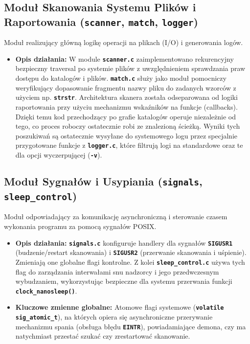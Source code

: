 \documentclass{article}
\begin{document}
	\subsection{Moduł Skanowania Systemu Plików i Raportowania (\textbf{\texttt{scanner}}, \textbf{\texttt{match}}, \textbf{\texttt{logger}})}
	Moduł realizujący główną logikę operacji na plikach (I/O) i generowania logów.
	\begin{itemize}
		\item \textbf{Opis działania:} W module \textbf{\texttt{scanner.c}} zaimplementowano rekurencyjny bezpieczny traversal po systemie plików z uwzględnieniem sprawdzania praw dostępu do katalogów i plików. \textbf{\texttt{match.c}} służy jako moduł pomocniczy weryfikujący dopasowanie fragmentu nazwy pliku do zadanych wzorców z użyciem np. \textbf{\texttt{strstr}}. Architektura skanera została odseparowana od logiki raportowania przy użyciu mechanizmu wskaźników na funkcje (callbacks). Dzięki temu kod przechodzący po grafie katalogów operuje niezależnie od tego, co proces roboczy ostatecznie robi ze znalezioną ścieżką. Wyniki tych poszukiwań są ostatecznie wysyłane do systemowego logu przez specjalnie przygotowane funkcje z \textbf{\texttt{logger.c}}, które filtrują logi na standardowe oraz te dla opcji wyczerpującej (\textbf{\texttt{-v}}).
	\end{itemize}
	
	\subsection{Moduł Sygnałów i Usypiania (\textbf{\texttt{signals}}, \textbf{\texttt{sleep\_control}})}
	Moduł odpowiadający za komunikację asynchroniczną i sterowanie czasem wykonania programu za pomocą sygnałów POSIX.
	\begin{itemize}
		\item \textbf{Opis działania:} \textbf{\texttt{signals.c}} konfiguruje handlery dla sygnałów \textbf{\texttt{SIGUSR1}} (budzenie/restart skanowania) i \textbf{\texttt{SIGUSR2}} (przerwanie skanowania i uśpienie). Zmieniają one globalne flagi kontrolne. Z kolei \textbf{\texttt{sleep\_control.c}} używa tych flag do zarządzania interwałami snu nadzorcy i jego przedwczesnym wybudzaniem, wykorzystując bezpieczne dla systemu przerwania funkcji \textbf{\texttt{clock\_nanosleep()}}.
		\item \textbf{Kluczowe zmienne globalne:} Atomowe flagi systemowe (\textbf{\texttt{volatile sig\_atomic\_t}}), na których opiera się asynchroniczne przerywanie mechanizmu spania (obsługa błędu \textbf{\texttt{EINTR}}), powiadamiające demona, czy ma natychmiast przestać szukać czy zrestartować skanowanie.
	\end{itemize}
	
\end{document}
